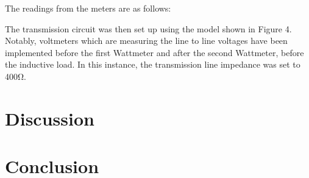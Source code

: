 \documentclass{article}
\begin{document}
The readings from the meters are as follows:
\begin{center}
\end{center}

The transmission circuit was then set up using the model shown in Figure 4. Notably, voltmeters which are measuring the line to line voltages have been implemented before the first Wattmeter and after the second Wattmeter, before the inductive load. In this instance, the transmission line impedance was set to 400$\si{\ohm}$.

\section{Discussion}




\section{Conclusion}
\end{document}
